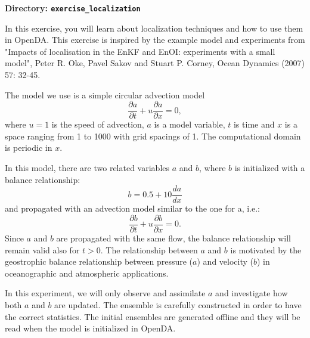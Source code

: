 {\bf Directory: {\tt exercise\_localization}}

In this exercise, you will learn about localization techniques and how to use them in OpenDA. This exercise is inspired by the example model and experiments from "Impacts of localisation in the EnKF and EnOI: experiments with a small model", Peter R. Oke, Pavel Sakov and Stuart P. Corney, Ocean Dynamics (2007) 57: 32-45.

The model we use is a simple circular advection model 
\begin{equation}
\frac{\partial a}{\partial t}+u\frac{\partial a}{\partial x}=0,
\end{equation}
where $u=1$ is the speed of advection, $a$ is a model variable, $t$ is time and $x$ is a space ranging from 1 to 1000 with grid spacings of 1. The computational domain is periodic in $x$.

In this model, there are two related variables $a$ and $b$, where $b$ is initialized with a balance relationship:
\begin{equation}\label{eg:b_relation}
b= 0.5 + 10 \frac{da}{dx}
\end{equation}
and propagated with an advection model similar to the one for a, i.e.:
\begin{equation}
\frac{\partial b}{\partial t}+u\frac{\partial b}{\partial x}=0.
\end{equation}
Since $a$ and $b$ are propagated with the same flow, the balance relationship will remain valid also for $t>0$.
The relationship between $a$ and $b$ is motivated by the geostrophic balance relationship between pressure ($a$) and velocity ($b$) in oceanographic and atmospheric applications. 

In this experiment, we will only observe and assimilate $a$ and investigate how both $a$ and $b$ are updated. 
The ensemble is carefully constructed in order to have the correct statistics. The initial ensembles are generated offline and they will be read when the model is initialized in OpenDA. 

